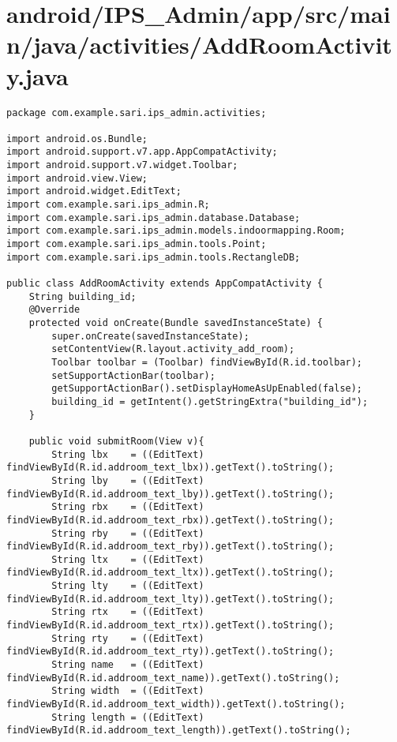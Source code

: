 \section{android/IPS\_Admin/app/src/main/java/activities/AddRoomActivity.java}
\begin{lstlisting}package com.example.sari.ips_admin.activities;

import android.os.Bundle;
import android.support.v7.app.AppCompatActivity;
import android.support.v7.widget.Toolbar;
import android.view.View;
import android.widget.EditText;
import com.example.sari.ips_admin.R;
import com.example.sari.ips_admin.database.Database;
import com.example.sari.ips_admin.models.indoormapping.Room;
import com.example.sari.ips_admin.tools.Point;
import com.example.sari.ips_admin.tools.RectangleDB;

public class AddRoomActivity extends AppCompatActivity {
    String building_id;
    @Override
    protected void onCreate(Bundle savedInstanceState) {
        super.onCreate(savedInstanceState);
        setContentView(R.layout.activity_add_room);
        Toolbar toolbar = (Toolbar) findViewById(R.id.toolbar);
        setSupportActionBar(toolbar);
        getSupportActionBar().setDisplayHomeAsUpEnabled(false);
        building_id = getIntent().getStringExtra("building_id");
    }

    public void submitRoom(View v){
        String lbx    = ((EditText) findViewById(R.id.addroom_text_lbx)).getText().toString();
        String lby    = ((EditText) findViewById(R.id.addroom_text_lby)).getText().toString();
        String rbx    = ((EditText) findViewById(R.id.addroom_text_rbx)).getText().toString();
        String rby    = ((EditText) findViewById(R.id.addroom_text_rby)).getText().toString();
        String ltx    = ((EditText) findViewById(R.id.addroom_text_ltx)).getText().toString();
        String lty    = ((EditText) findViewById(R.id.addroom_text_lty)).getText().toString();
        String rtx    = ((EditText) findViewById(R.id.addroom_text_rtx)).getText().toString();
        String rty    = ((EditText) findViewById(R.id.addroom_text_rty)).getText().toString();
        String name   = ((EditText) findViewById(R.id.addroom_text_name)).getText().toString();
        String width  = ((EditText) findViewById(R.id.addroom_text_width)).getText().toString();
        String length = ((EditText) findViewById(R.id.addroom_text_length)).getText().toString();



\end{lstlisting}
